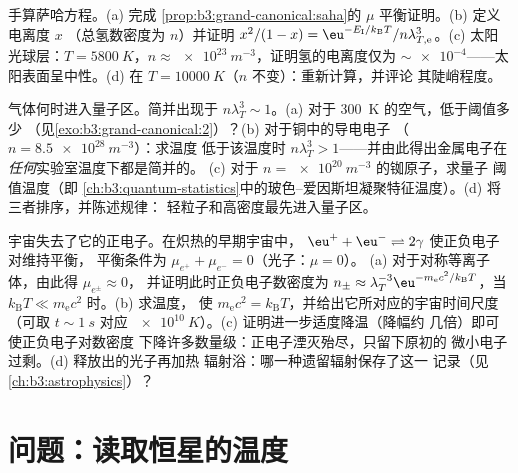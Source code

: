 \begin{exercise}[$\star\star\star$]\label{exo:b3:grand-canonical:10}
手算萨哈方程。(a) 完成
\cref{prop:b3:grand-canonical:saha}的 $\mu$ 平衡证明。(b) 定义电离度 $x$
（总氢数密度为 $n$）并证明 $x^2/(1 - x)
= \eu^{-E_{\text{I}}/k_{\text{B}}T}/n\lambda_{T,\text{e}}^3$。(c)
太阳光球层：$T = \qty{5800}{K}$，$n \approx
\qty{e23}{m^{-3}}$，证明氢的电离度仅为
$\sim\num{e-4}$——太阳表面呈中性。(d) 在 $T =
\qty{10000}{K}$（$n$ 不变）：重新计算，并评论
其陡峭程度。
\end{exercise}

\begin{exercise}[$\star\star\star$]\label{exo:b3:grand-canonical:11}
气体何时进入量子区。简并出现于 $n\lambda_T^3 \sim
1$。(a) 对于 \qty{300}{K} 的空气，低于阈值多少
（见\cref{exo:b3:grand-canonical:2}）？(b) 对于铜中的导电电子
（$n = \qty{8.5e28}{m^{-3}}$）：求温度
低于该温度时 $n\lambda_T^3 > 1$——并由此得出金属电子在
\emph{任何}实验室温度下都是简并的。
(c) 对于 $n = \qty{e20}{m^{-3}}$ 的铷原子，求量子
阈值温度（即
\cref{ch:b3:quantum-statistics}中的玻色–爱因斯坦凝聚特征温度）。(d) 将三者排序，并陈述规律：
轻粒子和高密度最先进入量子区。
\end{exercise}

\begin{exercise}[$\star\star\star$]\label{exo:b3:grand-canonical:12}
宇宙失去了它的正电子。在炽热的早期宇宙中，
$\eu^+ + \eu^- \rightleftharpoons 2\gamma$ 使正负电子对维持平衡，
平衡条件为 $\mu_{e^+} + \mu_{e^-} = 0$（光子：$\mu = 0$）。
(a) 对于对称等离子体，由此得 $\mu_{e^\pm} \approx 0$，
并证明此时正负电子数密度为 $n_\pm \approx
\lambda_T^{-3}\eu^{-m_{\text{e}}c^2/k_{\text{B}}T}$，当
$k_{\text{B}}T \ll m_{\text{e}}c^2$ 时。(b) 求温度，
使 $m_{\text{e}}c^2 = k_{\text{B}}T$，并给出它所对应的宇宙时间尺度
（可取 $t \sim \qty{1}{s}$ 对应
$\qty{e10}{K}$）。(c) 证明进一步适度降温（降幅约
几倍）即可使正负电子对数密度
下降许多数量级：正电子湮灭殆尽，只留下原初的
微小电子过剩。(d) 释放出的光子再加热
辐射浴：哪一种遗留辐射保存了这一
记录（见\cref{ch:b3:astrophysics}）？
\end{exercise}

\section{问题：读取恒星的温度}

